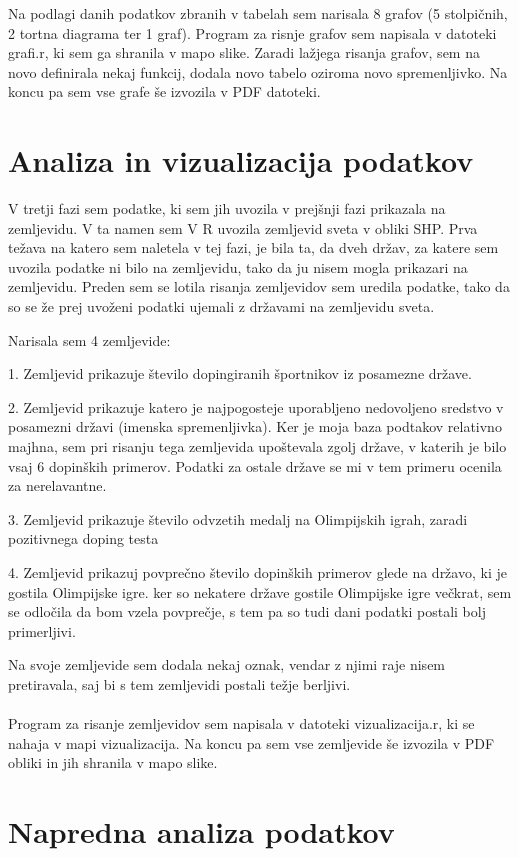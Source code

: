 \documentclass[11pt,a4paper]{article}
\begin{document}
Na podlagi danih podatkov zbranih v tabelah sem narisala 8 grafov (5 stolpičnih, 2 tortna diagrama ter 1 graf).
Program za risnje grafov sem napisala v datoteki grafi.r, ki sem ga shranila v mapo slike. Zaradi lažjega risanja grafov, sem na novo definirala nekaj funkcij, dodala novo tabelo oziroma novo spremenljivko.
Na koncu pa sem vse grafe še izvozila v PDF datoteki.



\newpage

\section{Analiza in vizualizacija podatkov}

V tretji fazi sem podatke, ki sem jih uvozila v prejšnji fazi prikazala na zemljevidu.
V ta namen sem V R uvozila zemljevid sveta v obliki SHP.
Prva težava na katero sem naletela v tej fazi, je bila ta, da dveh držav, za katere sem uvozila podatke ni bilo na zemljevidu, tako da ju nisem mogla prikazari na zemljevidu. 
Preden sem se lotila risanja zemljevidov sem uredila podatke, tako da so se že prej uvoženi podatki ujemali z državami na zemljevidu sveta.

Narisala sem 4 zemljevide:

1. Zemljevid prikazuje število dopingiranih športnikov iz posamezne države.

2. Zemljevid prikazuje katero je najpogosteje uporabljeno nedovoljeno sredstvo v posamezni državi (imenska spremenljivka).
Ker je moja baza podtakov relativno majhna, sem pri risanju tega zemljevida upoštevala zgolj države, v katerih je bilo vsaj 6 dopinških primerov. Podatki za ostale države se mi v tem primeru ocenila za nerelavantne.

3. Zemljevid prikazuje število odvzetih medalj na Olimpijskih igrah, zaradi pozitivnega doping testa

4. Zemljevid prikazuj povprečno število dopinških primerov glede na državo, ki je gostila Olimpijske igre. 
ker so nekatere države gostile Olimpijske igre večkrat, sem se odločila da bom vzela povprečje, s tem pa so tudi dani podatki postali bolj primerljivi.

Na svoje zemljevide sem dodala nekaj oznak, vendar z njimi raje nisem pretiravala, saj bi s tem zemljevidi postali težje berljivi.\\
\\
Program za risanje zemljevidov sem napisala v datoteki vizualizacija.r, ki se nahaja v mapi vizualizacija. 
Na koncu pa sem vse zemljevide še izvozila v PDF obliki in jih shranila v mapo slike.



\section{Napredna analiza podatkov}

\end{document}
